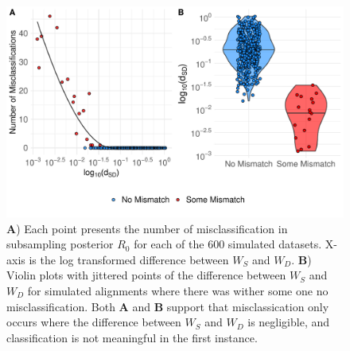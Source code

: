 \documentclass{article}
\begin{document}
\begin{figure}[H]
\centering
\includegraphics[width=1\linewidth]{../figures/errorWasserstein.pdf}
\caption{ \textbf{A}) Each point presents the number of misclassification in subsampling posterior $R_0$ for each of the 600 simulated datasets. X-axis is the log transformed difference between $W_S$ and $W_D$. \textbf{B}) Violin plots with jittered points of the difference between $W_S$ and $W_D$ for simulated alignments where there was wither some one no misclassification. Both \textbf{A} and \textbf{B} support that misclassication only occurs where the difference between $W_S$ and $W_D$ is negligible, and classification is not meaningful in the first instance.}
\label{fig:validateW}
\end{figure}
\end{document}
